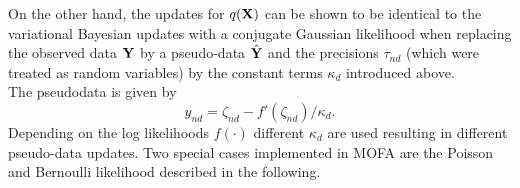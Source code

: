 On the other hand, the updates for $q({\bf X})$ can be shown to be identical to the variational Bayesian updates with a conjugate Gaussian likelihood when replacing the observed data ${\bf Y}$ by a pseudo-data $\hat{{\bf Y}}$ and the precisions $\tau_{nd}$ (which were treated as random variables) by the constant terms $\kappa_d$ introduced above.\\
The pseudodata is given by
\begin{equation*}
\hat{y}_{nd} = \zeta_{nd} - f'(\zeta_{nd})/\kappa_d.
\end{equation*}
Depending on the log likelihoods $f(\cdot)$ different $\kappa_d$ are used resulting in different pseudo-data updates. Two special cases implemented in MOFA are the Poisson and Bernoulli likelihood described in the following.

